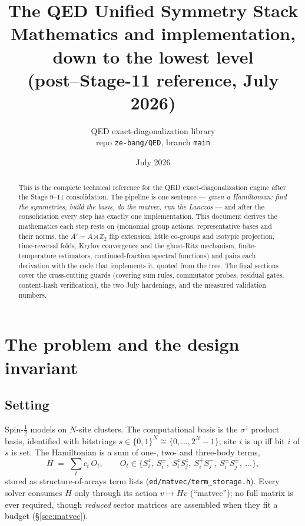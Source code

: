 \documentclass[11pt]{article}
\title{\bfseries The QED Unified Symmetry Stack\\
\large Mathematics and implementation, down to the lowest level\\
\normalsize (post--Stage-11 reference, July 2026)}
\author{QED exact-diagonalization library \\ \small repo \texttt{ze-bang/QED}, branch \texttt{main}}
\date{July 2026}
\newcommand{\Z}{\mathbb{Z}}
\newcommand{\file}[1]{\texttt{\small #1}}
\begin{document}
\maketitle

\begin{abstract}
This is the complete technical reference for the QED exact-diagonalization
engine after the Stage 9--11 consolidation. The pipeline is one sentence
--- \emph{given a Hamiltonian: find the symmetries, build the basis, do the
matvec, run the Lanczos} --- and after the consolidation every step has
exactly one implementation. This document derives the mathematics each step
rests on (monomial group actions, representative bases and their norms, the
$A' = A \rtimes \Z_2$ flip extension, little co-groups and isotypic
projection, time-reversal folds, Krylov convergence and the ghost-Ritz
mechanism, finite-temperature estimators, continued-fraction spectral
functions) and pairs each derivation with the code that implements it,
quoted from the tree. The final sections cover the cross-cutting guards
(covering sum rules, commutator probes, residual gates, content-hash
verification), the two July hardenings, and the measured validation
numbers.
\end{abstract}

\tableofcontents

\section{The problem and the design invariant}

\subsection{Setting}

Spin-$\tfrac12$ models on $N$-site clusters. The computational basis is the
$\sigma^z$ product basis, identified with bitstrings $s \in \{0,1\}^N \cong
\{0,\dots,2^N-1\}$; site $i$ is up iff bit $i$ of $s$ is set. The
Hamiltonian is a sum of one-, two- and three-body terms,
\[
  H \;=\; \sum_t c_t \, O_t, \qquad
  O_t \in \{S^z_i,\ S^\pm_i,\ S^z_iS^z_j,\ S^+_iS^-_j,\ S^\pm_iS^\pm_j,\ \dots\},
\]
stored as structure-of-arrays term lists (\file{ed/matvec/term\_storage.h}).
Every solver consumes $H$ only through its action $v \mapsto Hv$
(``matvec''); no full matrix is ever required, though \emph{reduced} sector
matrices are assembled when they fit a budget (\S\ref{sec:matvec}).
\end{document}
